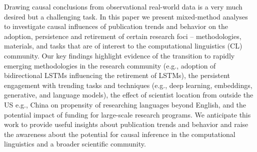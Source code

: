 Drawing causal conclusions from observational real-world data is a very much desired but a challenging task. In this paper we present mixed-method analyses to investigate causal influences of publication trends and behavior on the adoption, persistence and retirement of certain research foci -- methodologies, materials, and tasks that are of interest to the computational linguistics (CL) community. Our key findings highlight evidence of the transition to rapidly emerging methodologies in the research community (e.g., adoption of bidirectional LSTMs influencing the retirement of LSTMs), the persistent engagement with trending tasks and techniques (e.g., deep learning, embeddings, generative, and language models), the effect of scientist location from outside the US e.g., China on propensity of researching languages beyond English, and the potential impact of funding for large-scale research programs. We anticipate this work to provide useful insights about publication trends and behavior and raise the awareness about the potential for causal inference in the computational linguistics and a broader scientific community.
